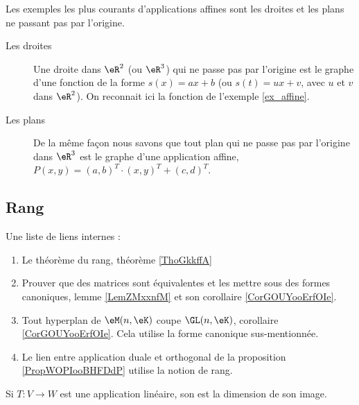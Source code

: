 \begin{example}
	Les exemples les plus courants d'applications affines sont les droites et les plans ne passant pas par l'origine.
	\begin{description}
		\item[Les droites] Une droite dans $\eR^2$ (ou $\eR^3$) qui ne passe pas par l'origine est le graphe d'une fonction de la forme $s(x)=ax+b$ (ou $s(t)=u x +v$, avec $u$ et $v$  dans $\eR^2$). On reconnait ici la fonction de l'exemple \ref{ex_affine}.
			
		\item[Les plans]
			De la même façon nous savons que tout plan qui ne passe pas par l'origine dans $\eR^3$ est le graphe d'une application affine, $P(x,y)= (a,b)^T\cdot(x,y)^T+(c,d)^T$.
	\end{description}
\end{example}

\subsection{Rang}

Une liste de liens internes :
\begin{enumerate}
    \item Le théorème du rang, théorème \ref{ThoGkkffA}
    \item Prouver que des matrices sont équivalentes et les mettre sous des formes canoniques, lemme \ref{LemZMxxnfM} et son corollaire \ref{CorGOUYooErfOIe}.
    \item Tout hyperplan de \( \eM(n,\eK)\) coupe \( \GL(n,\eK)\), corollaire \ref{CorGOUYooErfOIe}. Cela utilise la forme canonique sus-mentionnée.
    \item Le lien entre application duale et orthogonal de la proposition \ref{PropWOPIooBHFDdP} utilise la notion de rang.
\end{enumerate}

\begin{definition}\label{DefALUAooSPcmyK}
    Si  $T\colon V\to W$ est une application linéaire, son  est la dimension de son image. 
\end{definition}

